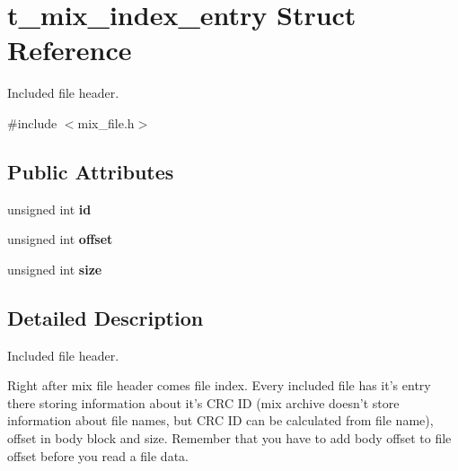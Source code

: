 \hypertarget{structt__mix__index__entry}{
\section{t\_\-mix\_\-index\_\-entry Struct Reference}
\label{structt__mix__index__entry}
}


Included file header.  




{\ttfamily \#include $<$mix\_\-file.h$>$}

\subsection*{Public Attributes}
\begin{DoxyCompactItemize}
\item 
\hypertarget{structt__mix__index__entry_ad69aa6eaf1c69dd2e46e4ffefa697d01}{
unsigned int {\bfseries id}}
\label{structt__mix__index__entry_ad69aa6eaf1c69dd2e46e4ffefa697d01}

\item 
\hypertarget{structt__mix__index__entry_ab175944b00017cd22a305680a9f915a1}{
unsigned int {\bfseries offset}}
\label{structt__mix__index__entry_ab175944b00017cd22a305680a9f915a1}

\item 
\hypertarget{structt__mix__index__entry_a6991b2b6361cd9b05b22c16a1b06f612}{
unsigned int {\bfseries size}}
\label{structt__mix__index__entry_a6991b2b6361cd9b05b22c16a1b06f612}

\end{DoxyCompactItemize}


\subsection{Detailed Description}
Included file header. 

Right after mix file header comes file index. Every included file has it's entry there storing information about it's CRC ID (mix archive doesn't store information about file names, but CRC ID can be calculated from file name), offset in body block and size. Remember that you have to add body offset to file offset before you read a file data.

